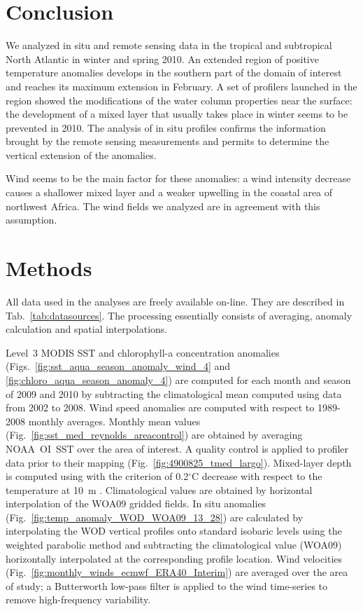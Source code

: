 \documentclass[12pt]{article}
\begin{document}
\section*{Conclusion}

We analyzed in situ and remote sensing data in the tropical and subtropical North Atlantic in winter and spring 2010. An extended region of positive temperature anomalies develops in the southern part of the domain of interest and reaches its maximum extension in February. A set of profilers launched in the region showed the modifications of the water column properties near the surface: the development of a mixed layer that usually takes place in winter seems to be prevented in 2010. The analysis of in situ profiles confirms the information brought by the remote sensing measurements and permits to determine the vertical extension of the anomalies.  

Wind seems to be the main factor for these anomalies: a wind intensity decrease causes a shallower mixed layer and a weaker upwelling in the coastal area of northwest Africa. The wind fields we analyzed are in agreement with this assumption. 


\section*{Methods}
All data used in the analyses are freely available on-line. They are described in Tab.~\ref{tab:datasources}. The processing essentially consists of averaging, anomaly calculation and spatial interpolations.
 
Level~3 MODIS SST and chlorophyll-a concentration anomalies (Figs.~\ref{fig:sst_aqua_season_anomaly_wind_4} and \ref{fig:chloro_aqua_season_anomaly_4}) are computed for each month and season of 2009 and 2010 by subtracting the climatological mean computed using data from 2002 to 2008. Wind speed anomalies are computed with respect to 1989-2008 monthly averages. Monthly mean values (Fig.~\ref{fig:sst_med_reynolds_areacontrol}) are obtained by averaging NOAA~OI~SST over the area of interest. A quality control is applied to profiler data prior to their mapping (Fig.~\ref{fig:4900825_tmed_largo}). Mixed-layer depth is computed using with the criterion of 0.2$^{\circ}$C decrease with respect to the temperature at 10~m \citep{KARA00}. Climatological values are obtained by horizontal interpolation of the WOA09 gridded fields. In situ anomalies (Fig.~\ref{fig:temp_anomaly_WOD_WOA09_13_28}) are calculated by interpolating the WOD vertical profiles onto standard isobaric levels using the weighted parabolic method \citep[WPI,][]{REINIGER68} and subtracting the climatological value (WOA09) horizontally interpolated at the corresponding profile location. Wind velocities (Fig.~\ref{fig:monthly_winds_ecmwf_ERA40_Interim}) are averaged over the area of study; a Butterworth low-pass filter is applied to the wind time-series to remove high-frequency variability.
\end{document}
